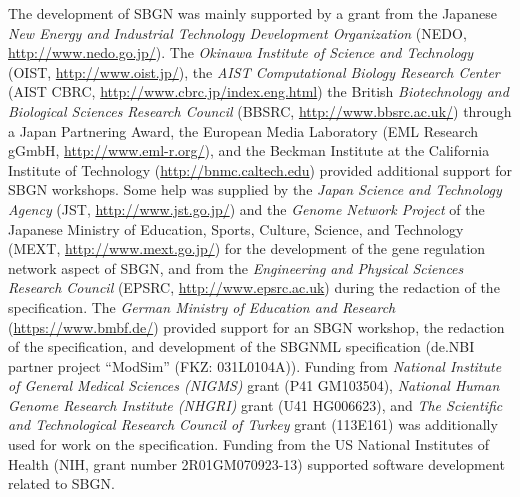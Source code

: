 The development of SBGN was mainly supported by a grant from the Japanese \emph{New Energy and Industrial Technology Development Organization} (NEDO, \url{http://www.nedo.go.jp/}). The \emph{Okinawa Institute of Science and Technology} (OIST, \url{http://www.oist.jp/}), the \emph{AIST Computational Biology Research Center} (AIST CBRC, \url{http://www.cbrc.jp/index.eng.html}) the British \emph{Biotechnology and Biological Sciences Research Council} (BBSRC, \url{http://www.bbsrc.ac.uk/}) through a Japan Partnering Award, the European Media Laboratory (EML Research gGmbH, \url{http://www.eml-r.org/}), and the Beckman Institute at the California Institute of Technology (\url{http://bnmc.caltech.edu}) provided additional support for SBGN workshops. Some help was supplied by the \emph{Japan Science and Technology Agency} (JST, \url{http://www.jst.go.jp/}) and the \emph{Genome Network Project} of the Japanese Ministry of Education, Sports, Culture, Science, and Technology (MEXT, \url{http://www.mext.go.jp/}) for the development of the gene regulation network aspect of SBGN, and from the \emph{Engineering and Physical Sciences Research Council} (EPSRC, \url{http://www.epsrc.ac.uk}) during the redaction of the specification. The \emph{German Ministry of Education and Research} (\url{https://www.bmbf.de/}) provided support for an SBGN workshop, the redaction of the specification, and development of the SBGNML specification (de.NBI partner project ``ModSim'' (FKZ: 031L0104A)). Funding from \emph{National Institute of General Medical Sciences (NIGMS)} grant (P41 GM103504), \emph{National Human Genome Research Institute (NHGRI)} grant (U41 HG006623), and \emph{The Scientific and Technological Research Council of Turkey} grant (113E161) was additionally used for work on the specification. Funding from the US National Institutes of Health (NIH, grant number 2R01GM070923-13) supported software development related to SBGN.
